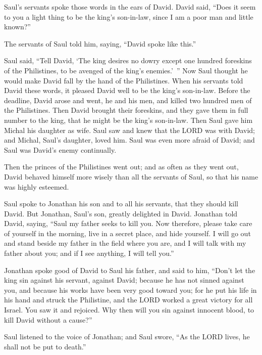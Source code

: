 \myverse{}Saul’s servants spoke those words in the ears of David. David
said, “Does it seem to you a light thing to be the king’s son-in-law, since I am a poor man and little
known?”

\myverse{}The servants of Saul told him, saying, “David spoke like this.”

\myverse{}Saul said, “Tell David, ‘The king desires no dowry except one
hundred foreskins of the Philistines, to be avenged of the king’s enemies.’ ” Now Saul thought he would
make David fall by the hand of the Philistines.
\myverse{}When his servants told David these words, it pleased David well to be the
king’s son-in-law. Before the deadline,
\myverse{}David arose and went, he and his men, and killed two hundred men of the Philistines.
Then David brought their foreskins, and they gave them in full number to the king, that he might be the
king’s son-in-law. Then Saul gave him Michal his daughter as wife.
\myverse{}Saul saw and knew that the LORD was with David; and Michal, Saul’s daughter,
loved him.
\myverse{}Saul was even more afraid of David; and Saul was David’s enemy continually.

\myverse{}Then the princes of the Philistines went out; and as often as
they went out, David behaved himself more wisely than all the servants of Saul, so that his name was highly
esteemed.


\mychapter{} \myverse*{}Saul spoke to Jonathan his son and to all his servants, that they
should kill David. But Jonathan, Saul’s son, greatly delighted in David.
\myverse{}Jonathan told David, saying, “Saul my father seeks to kill you. Now therefore,
please take care of yourself in the morning, live in a secret place, and hide yourself.
\myverse{}I will go out and stand beside my father in the field where you are, and I
will talk with my father about you; and if I see anything, I will tell you.”

\myverse{}Jonathan spoke good of David to Saul his father, and said to him,
“Don’t let the king sin against his servant, against David; because he has not sinned against you, and
because his works have been very good toward you;
\myverse{}for he put his life in his hand and struck the Philistine, and the LORD worked
a great victory for all Israel. You saw it and rejoiced. Why then will you sin against innocent blood,
to kill David without a cause?”

\myverse{}Saul listened to the voice of Jonathan; and Saul swore, “As the
LORD lives, he shall not be put to death.”

